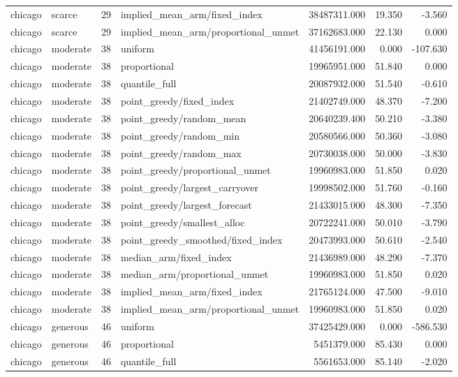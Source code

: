 \begin{tabular}{llrlrrr}
chicago & scarce & 29 & implied\_mean\_arm/fixed\_index & 38487311.000 & 19.350 & -3.560 \\
chicago & scarce & 29 & implied\_mean\_arm/proportional\_unmet & 37162683.000 & 22.130 & 0.000 \\
chicago & moderate & 38 & uniform & 41456191.000 & 0.000 & -107.630 \\
chicago & moderate & 38 & proportional & 19965951.000 & 51.840 & 0.000 \\
chicago & moderate & 38 & quantile\_full & 20087932.000 & 51.540 & -0.610 \\
chicago & moderate & 38 & point\_greedy/fixed\_index & 21402749.000 & 48.370 & -7.200 \\
chicago & moderate & 38 & point\_greedy/random\_mean & 20640239.400 & 50.210 & -3.380 \\
chicago & moderate & 38 & point\_greedy/random\_min & 20580566.000 & 50.360 & -3.080 \\
chicago & moderate & 38 & point\_greedy/random\_max & 20730038.000 & 50.000 & -3.830 \\
chicago & moderate & 38 & point\_greedy/proportional\_unmet & 19960983.000 & 51.850 & 0.020 \\
chicago & moderate & 38 & point\_greedy/largest\_carryover & 19998502.000 & 51.760 & -0.160 \\
chicago & moderate & 38 & point\_greedy/largest\_forecast & 21433015.000 & 48.300 & -7.350 \\
chicago & moderate & 38 & point\_greedy/smallest\_alloc & 20722241.000 & 50.010 & -3.790 \\
chicago & moderate & 38 & point\_greedy\_smoothed/fixed\_index & 20473993.000 & 50.610 & -2.540 \\
chicago & moderate & 38 & median\_arm/fixed\_index & 21436989.000 & 48.290 & -7.370 \\
chicago & moderate & 38 & median\_arm/proportional\_unmet & 19960983.000 & 51.850 & 0.020 \\
chicago & moderate & 38 & implied\_mean\_arm/fixed\_index & 21765124.000 & 47.500 & -9.010 \\
chicago & moderate & 38 & implied\_mean\_arm/proportional\_unmet & 19960983.000 & 51.850 & 0.020 \\
chicago & generous & 46 & uniform & 37425429.000 & 0.000 & -586.530 \\
chicago & generous & 46 & proportional & 5451379.000 & 85.430 & 0.000 \\
chicago & generous & 46 & quantile\_full & 5561653.000 & 85.140 & -2.020 \\

\end{tabular}
